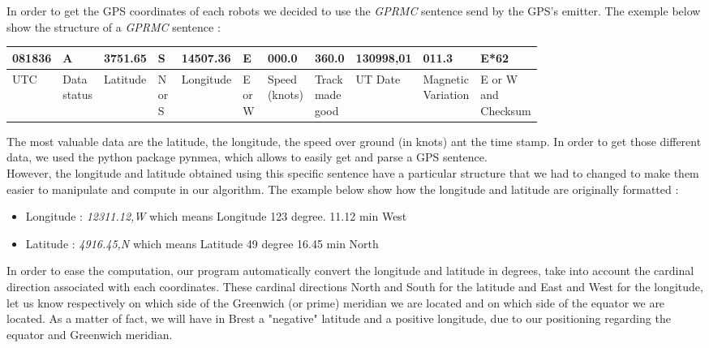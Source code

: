 \documentclass[10pt,a4paper]{report}
\begin{document}
In order to get the GPS coordinates of each robots we decided to use the \textit{GPRMC} sentence send by the GPS's emitter. The exemple below show the structure of a \textit{GPRMC} sentence : \
\begin{center}
\begin{tabular}{|m{0.05\linewidth}|m{0.06\linewidth}|m{0.07\linewidth}|m{0.07\linewidth}|m{0.08\linewidth}|m{0.07\linewidth}|m{0.07\linewidth}|m{0.04\linewidth}|m{0.08\linewidth}|m{0.1\linewidth}|m{0.07\linewidth}|}
\hline
    081836 & A & 3751.65 & S & 14507.36 & E & 000.0 & 360.0 & 130998,01 & 011.3 & E*62  \\ \hline
     UTC & Data status & Latitude & N or S & Longitude & E or W & Speed (knots) & Track made good &  UT Date & Magnetic Variation & E or W and Checksum \\ \hline

\end{tabular}
\end{center}
The most valuable data are the latitude, the longitude, the speed over ground (in knots) ant the time stamp. In order to get those different data, we used the python package pynmea, which allows to easily get and parse a GPS sentence. \\
However, the longitude and latitude obtained using this specific sentence have a particular structure that we had to changed to make them easier to manipulate and compute in our algorithm. The example below show how the longitude and latitude are originally formatted :
\
\begin{itemize}
  \item Longitude  : \textit{12311.12,W} which means Longitude 123 degree. 11.12 min West
  \item Latitude : \textit{4916.45,N} which means Latitude 49 degree 16.45 min North
\end{itemize}

In order to ease the computation, our program automatically convert the longitude and latitude in degrees, take into account the cardinal direction associated with each coordinates.
These cardinal directions North and South for the latitude and East and West for the longitude, let us know respectively on which side of the Greenwich (or prime) meridian we are located and on which side of the equator we are located. As a matter of fact, we will have in Brest a "negative" latitude and a positive longitude, due to our positioning regarding the equator and Greenwich meridian.\\
\end{document}
